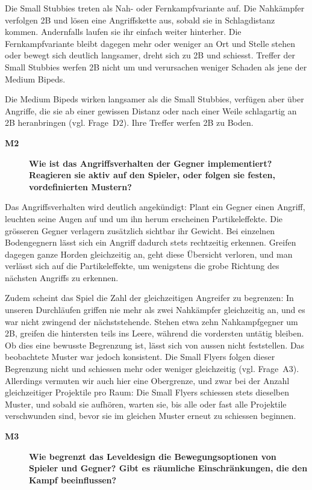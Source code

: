 \documentclass[../Main.tex]{subfiles}
\begin{document}
Die Small Stubbies treten als Nah- oder Fernkampfvariante auf. Die Nahkämpfer verfolgen 2B und lösen eine Angriffskette aus, sobald sie in Schlagdistanz kommen. Andernfalls laufen sie ihr einfach weiter hinterher. Die Fernkampfvariante bleibt dagegen mehr oder weniger an Ort und Stelle stehen oder bewegt sich deutlich langsamer, dreht sich zu 2B und schiesst. Treffer der Small Stubbies werfen 2B nicht um und verursachen weniger Schaden als jene der Medium Bipeds.

Die Medium Bipeds wirken langsamer als die Small Stubbies, verfügen aber über Angriffe, die sie ab einer gewissen Distanz oder nach einer Weile schlagartig an 2B heranbringen (vgl. Frage~D2). Ihre Treffer werfen 2B zu Boden.

\begin{description}
    \item[\textbf{M2}] \textbf{Wie ist das Angriffsverhalten der Gegner implementiert? Reagieren sie aktiv auf den Spieler, oder folgen sie festen, vordefinierten Mustern?}
\end{description}

Das Angriffsverhalten wird deutlich angekündigt: Plant ein Gegner einen Angriff, leuchten seine Augen auf und um ihn herum erscheinen Partikeleffekte. Die grösseren Gegner verlagern zusätzlich sichtbar ihr Gewicht. Bei einzelnen Bodengegnern lässt sich ein Angriff dadurch stets rechtzeitig erkennen. Greifen dagegen ganze Horden gleichzeitig an, geht diese Übersicht verloren, und man verlässt sich auf die Partikeleffekte, um wenigstens die grobe Richtung des nächsten Angriffs zu erkennen.

Zudem scheint das Spiel die Zahl der gleichzeitigen Angreifer zu begrenzen: In unseren Durchläufen griffen nie mehr als zwei Nahkämpfer gleichzeitig an, und es war nicht zwingend der nächststehende. Stehen etwa zehn Nahkampfgegner um 2B, greifen die hintersten teils ins Leere, während die vordersten untätig bleiben. Ob dies eine bewusste Begrenzung ist, lässt sich von aussen nicht feststellen. Das beobachtete Muster war jedoch konsistent. Die Small Flyers folgen dieser Begrenzung nicht und schiessen mehr oder weniger gleichzeitig (vgl. Frage~A3). Allerdings vermuten wir auch hier eine Obergrenze, und zwar bei der Anzahl gleichzeitiger Projektile pro Raum: Die Small Flyers schiessen stets dieselben Muster, und sobald sie aufhören, warten sie, bis alle oder fast alle Projektile verschwunden sind, bevor sie im gleichen Muster erneut zu schiessen beginnen.

\begin{description}
    \item[\textbf{M3}] \textbf{Wie begrenzt das Leveldesign die Bewegungsoptionen von Spieler und Gegner? Gibt es räumliche Einschränkungen, die den Kampf beeinflussen?}
\end{description}
\end{document}
